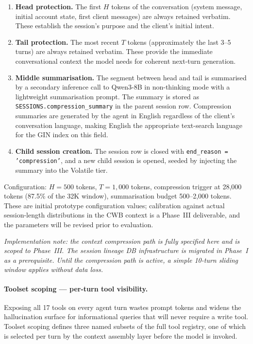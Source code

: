 \documentclass[12pt,a4paper]{report}
\begin{document}
\begin{enumerate}[noitemsep]
\item \textbf{Head protection.} The first $H$ tokens of the conversation (system
message, initial account state, first client messages) are always retained verbatim.
These establish the session's purpose and the client's initial intent.
\item \textbf{Tail protection.} The most recent $T$ tokens (approximately the last
3--5 turns) are always retained verbatim. These provide the immediate conversational
context the model needs for coherent next-turn generation.
\item \textbf{Middle summarisation.} The segment between head and tail is summarised
by a secondary inference call to Qwen3-8B in non-thinking mode with a lightweight
summarisation prompt. The summary is stored as \texttt{SESSIONS.compression\_summary}
in the parent session row. Compression summaries are generated by the agent in
English regardless of the client's conversation language, making English the
appropriate text-search language for the GIN index on this field.
\item \textbf{Child session creation.} The session row is closed with
\texttt{end\_reason = 'compression'}, and a new child session is opened, seeded
by injecting the summary into the Volatile tier.
\end{enumerate}

\noindent Configuration: $H = 500$ tokens, $T = 1{,}000$ tokens, compression
trigger at 28{,}000 tokens (87.5\% of the 32K window), summarisation budget
500--2{,}000 tokens. These are initial prototype configuration values; calibration
against actual session-length distributions in the CWB context is a Phase~III
deliverable, and the parameters will be revised prior to evaluation.

\textit{Implementation note: the context compression path is fully specified here
and is scoped to Phase~III. The session lineage DB infrastructure is migrated in
Phase~I as a prerequisite. Until the compression path is active, a simple
10-turn sliding window applies without data loss.}

\paragraph{Toolset scoping --- per-turn tool visibility.}

Exposing all 17 tools on every agent turn wastes prompt tokens and widens the
hallucination surface for informational queries that will never require a write
tool. Toolset scoping defines three named subsets of the full tool registry, one
of which is selected per turn by the context assembly layer before the model is
invoked.
\end{document}
